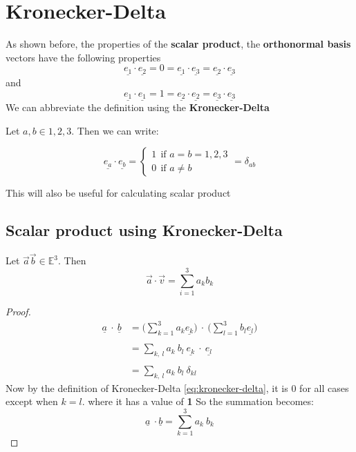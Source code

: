 \section{Kronecker-Delta}

As shown before, the properties of the {\bf scalar product}, the {\bf orthonormal basis} vectors have the following properties
$$\underline{e_{1}} \cdot \underline{e_{2}}= 0 = \underline{e_{1}} \cdot \underline{e_{3}} = \underline{e_{2}} \cdot \underline{e_{3}}$$
and
$$\underline{e_{1}} \cdot \underline{e_{1}}= 1 = \underline{e_{2}} \cdot \underline{e_{2}} = \underline{e_{3}} \cdot \underline{e_{3}}$$
We can abbreviate the definition using the {\bf Kronecker-Delta}

\begin{definition}

	Let $a,b \in {1,2,3}$. Then we can write:

	\begin{equation}
		\label{eq:kronecker-delta}
		\underline{e_{a}}\cdot \underline{e_{b}}
		=
		\begin{cases}
			1 \ \ \text{if } a = b = 1,2,3 \\
			0  \ \ \text{if } a \neq b
		\end{cases}
		= \delta_{ab}
	\end{equation}

	This will also be useful for calculating scalar product
\end{definition}

\subsection{Scalar product using Kronecker-Delta}
\begin{theorem}
	Let $\vec{a} \vec{b} \in \mathbb{E}^3$. Then
	\begin{equation}
		\vec{a} \cdot \vec{v} = \sum_{i=1}^{3}a_kb_k
	\end{equation}
\end{theorem}
\begin{proof}
	\begin{align*}
		\underline{a} \ \cdot \ \underline{b} & = \Big( \sum\limits_{k = 1}^{3}a_k\underline{e_{k}} \Big)\ \cdot \ \Big( \sum\limits_{l = 1}^{3}b_l\underline{e_{l}} \Big) \\ \\
		                                      & = \sum_{k, \ l} a_{k} \ b_{l} \ \underline{e_{k}}\ \cdot \ \underline{e_{l}}                                               \\ \\
		                                      & = \sum_{k, \ l} a_{k} \ b_{l} \ \delta_{kl}
	\end{align*}
	Now by the definition of Kronecker-Delta \ref{eq:kronecker-delta}, it is 0 for all cases except when $k = l$. where it has a value of {\bf 1} So the summation becomes:
	$$\underline{a} \ \cdot \underline{b} =\sum_{k=1}^{3} a_{k} \ b_{k}$$
\end{proof}
